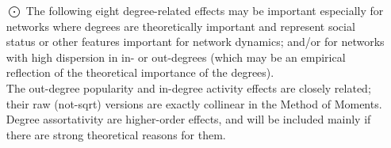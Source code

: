 \documentclass[a4paper,fleqn,11pt]{article}
\newcommand{\+}{\, + \,}
\begin{document}
\begin{enumerate}
\item[{\hspace*{-1ex}$\bigodot$}]
     The following eight degree-related effects may be important especially for networks
     where degrees are theoretically important and represent social status
     or other features important for network dynamics;
     and/or for networks with high dispersion in in- or out-degrees
     (which may be an empirical reflection of the theoretical importance
     of the degrees).\\
     The out-degree popularity and in-degree activity effects are closely
     related; their raw (not-sqrt) versions are exactly collinear in the
     Method of Moments.\\
     Degree assortativity are higher-order effects, and will be included
     mainly if there are strong theoretical reasons for them.


\end{enumerate}
\end{document}
